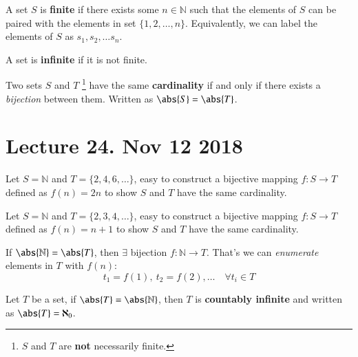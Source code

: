 \documentclass[11pt]{article}
\begin{document}
		\begin{definition}
			A set $S$ is \textbf{finite} if there exists some $n\in \mathbb{N}$ such that the elements of $S$ can be paired with the elements in set $\{1, 2, \dots, n\}$. Equivalently, we can label the elements of $S$ as $s_1, s_2, \dots s_n$.
		\end{definition}
		
		\begin{definition}
			A set is \textbf{infinite} if it is not finite.
		\end{definition}
		
		\begin{definition}
			Two sets $S$ and $T$ \footnote{$S$ and $T$ are \textbf{not} necessarily finite.} have the same \textbf{cardinality} if and only if there exists a \emph{bijection} between them. Written as $\abs{S} = \abs{T}$.
		\end{definition}
		
	\section{Lecture 24. Nov 12 2018}
		\begin{example}
			Let $S = \mathbb{N}$ and $T = \{2,4,6,\dots\}$, easy to construct a bijective mapping $f:S\to T$ defined as $f(n) = 2n$ to show $S$ and $T$ have the same cardinality.
		\end{example}

		\begin{example}
			Let $S = \mathbb{N}$ and $T = \{2,3,4,\dots\}$, easy to construct a bijective mapping $f:S\to T$ defined as $f(n) = n+1$ to show $S$ and $T$ have the same cardinality.
		\end{example}
		
		\begin{remark}
			If $\abs{\mathbb{N}} = \abs{T}$, then $\exists$ bijection $f:\mathbb{N} \to T$. That's we can \emph{enumerate} elements in $T$ with $f(n)$: 
			\[
				t_1 = f(1),\ t_2 = f(2),\dots \quad \forall t_i \in T
			\]
		\end{remark}
		
		\begin{definition}
			Let $T$ be a set, if $\abs{T} = \abs{\mathbb{N}}$, then $T$ is \textbf{countably infinite} and written as $\abs{T} = \aleph_0$.
		\end{definition}
		
\end{document}
